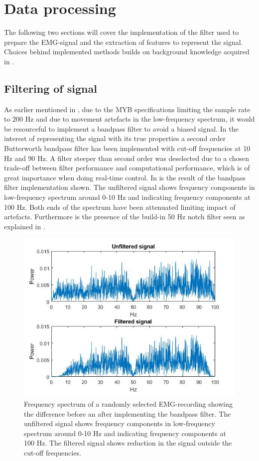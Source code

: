 

\section{Data processing} \label{sec:M:dataProcessing}

The following two sections will cover the implementation of the filter used to prepare the EMG-signal and the extraction of features to represent the signal. Choices behind implemented methods builds on background knowledge acquired in .

\subsection{Filtering of signal} \label{sub:M:filtering} 

As earlier mentioned in , due to the MYB specifications limiting the sample rate to 200 Hz and due to movement artefacts in the low-frequency spectrum, it would be resourceful to implement a bandpass filter to avoid a biased signal.
In the interest of representing the signal with its true properties a second order Butterworth bandpass filter has been implemented with cut-off frequencies at 10 Hz and 90 Hz. A filter steeper than second order was deselected due to a chosen trade-off between filter performance and computational performance, which is of great importance when doing real-time control. In  is the result of the bandpass filter implementation shown. The unfiltered signal shows frequency components in low-frequency spectrum around 0-10 Hz and indicating frequency components at 100 Hz. Both ends of the spectrum have been attenuated limiting impact of artefacts. Furthermore is the presence of the build-in 50 Hz notch filter seen as explained in .     


\begin{figure}[H]                 
\includegraphics[width=.8\textwidth]{figures/pMethods/Filt}  
\caption{Frequency spectrum of a randomly selected EMG-recording showing the difference before an after implementing the bandpass filter. The unfiltered signal shows frequency components in low-frequency spectrum around 0-10 Hz and indicating frequency components at 100 Hz. The filtered signal shows reduction in the signal outside the cut-off frequencies.}
\label{fig:filt} 
\end{figure}

